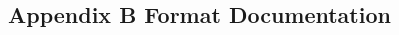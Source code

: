 \documentclass[class=book, crop=false]{standalone}
\begin{document}
\begin{CJK}{UTF8}{gbsn}

\chapter*{Appendix B Format Documentation}



\cleardoublepage

\end{CJK}
\end{document}
